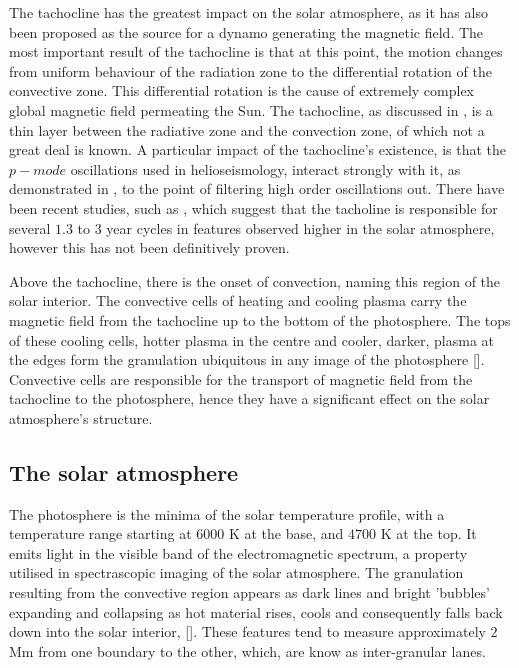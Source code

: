 The tachocline has the greatest impact on the solar atmosphere, as it has also been proposed as the source for a dynamo generating the magnetic field.
The most important result of the tachocline is that at this point, the motion changes from uniform behaviour of the radiation zone to the differential rotation of the convective zone.
This differential rotation is the cause of extremely complex global magnetic field permeating the Sun.
The tachocline, as discussed in \cite{Brun2001}, is a thin layer between the radiative zone and the convection zone, of which not a great deal is known.
A particular impact of the tachocline's existence, is that the $p-mode$ oscillations used in helioseismology, interact strongly with it, as demonstrated in \cite{Chaplin2014}, to the point of filtering high order oscillations out.
There have been recent studies, such as \cite{Obridko2007}, which suggest that the tacholine is responsible for several $1.3$ to $3$ year cycles in features observed higher in the solar atmosphere, however this has not been definitively proven.

Above the tachocline, there is the onset of convection, naming this region of the solar interior.
The convective cells of heating and cooling plasma carry the magnetic field from the tachocline up to the bottom of the photosphere.
The tops of these cooling cells, hotter plasma in the centre and cooler, darker, plasma at the edges form the granulation ubiquitous in any image of the photosphere [\cite{Nordlund2009}].
Convective cells are responsible for the transport of magnetic field from the tachocline to the photosphere, hence they have a significant effect on the solar atmosphere's structure.


\subsection{The solar atmosphere}
The photosphere is the minima of the solar temperature profile, with a temperature range starting at $6000$ K at the base, and $4700$ K at the top.
It emits light in the visible band of the electromagnetic spectrum, a property utilised in spectrascopic imaging of the solar atmosphere.
The granulation resulting from the convective region appears as dark lines and bright 'bubbles' expanding and collapsing as hot material rises, cools and consequently falls back down into the solar interior, [\cite{Nordlund2009}].
These features tend to measure approximately $2$ Mm from one boundary to the other, which, are know as inter-granular lanes.

